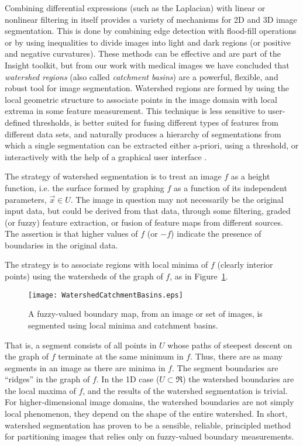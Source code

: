 %
%
%
%

Combining differential expressions (such as the Laplacian) with linear or
nonlinear filtering in itself provides a variety of mechanisms for 2D and 3D
image segmentation.  This is done by combining edge detection with flood-fill
operations or by using inequalities to divide images into light and dark
regions (or positive and negative curvatures).  These methods can be effective
and are part of the Insight toolkit, but from our work with medical images we
have concluded that {\em watershed regions} (also called {\em catchment
basins}) are a powerful, flexible, and robust tool for image segmentation.
Watershed regions are formed by using the local geometric structure to
associate points in the image domain with local extrema in some feature
measurement.  This technique is less sensitive to user-defined thresholds, is
better suited for fusing different types of features from different data sets,
and naturally produces a hierarchy of segmentations from which a single
segmentation can be extracted either a-priori, using a threshold, or
interactively with the help of a graphical user interface \cite{Yoo1992,Yoo1991}.

The strategy of watershed segmentation is to treat an image $f$ as a height
function, i.e.  the surface formed by graphing $f$ as a function of its
independent parameters, $\vec{x} \in U$.  The image in question may not
necessarily be the original input data, but could be derived from that data,
through some filtering, graded (or fuzzy) feature extraction, or fusion of
feature maps from different sources.  The assertion is that higher values of
$f$ (or $-f$) indicate the presence of boundaries in the original data.

The strategy is to associate regions with local minima of $f$ (clearly interior
points) using the watersheds of the graph of $f$, as in
Figure~\ref{fig:segment}.
\begin{figure}
\centering
\texttt{[image: WatershedCatchmentBasins.eps]}
\caption{A fuzzy-valued boundary map, from an image or set of images, 
is segmented using local minima and catchment basins.}
\protect\label{fig:segment}
\end{figure}
That is, a segment consists of all points in $U$ whose paths of steepest
descent on the graph of $f$ terminate at the same minimum in $f$.  Thus, there
are as many segments in an image as there are minima in $f$.  The segment
boundaries are ``ridges'' \cite{Koenderink1979,Koenderink1993,Eberly1996} in
the graph of $f$.  In the 1D case ($U \subset \Re$) the watershed boundaries
are the local maxima of $f$, and the results of the watershed segmentation is
trivial.  For higher-dimensional image domains, the watershed boundaries are
not simply local phenomenon, they depend on the shape of the entire watershed.
In short, watershed segmentation has proven to be a sensible, reliable,
principled method for partitioning images that relies only on fuzzy-valued
boundary measurements.

